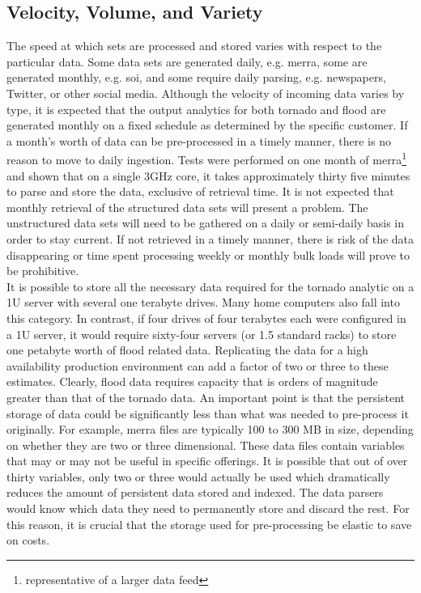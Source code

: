 \subsection{Velocity, Volume, and Variety}
The speed at which sets are processed and stored varies with respect to the particular data. Some data sets are generated daily, e.g. \gls{merra}, some are generated monthly, e.g. \gls{soi}, and some require daily parsing, e.g. newspapers, Twitter, or other social media. Although the velocity of incoming data varies by type, it is expected that the output analytics for both tornado and flood are generated monthly on a fixed schedule as determined by the specific customer. If a month's worth of data can be pre-processed in a timely manner, there is no reason to move to daily ingestion. Tests were performed on one month of  \gls{merra}\footnote{representative of a larger data feed} and shown that on a single 3GHz core, it takes approximately thirty five minutes to parse and store the data, exclusive of retrieval time. It is not expected that monthly retrieval of the structured data sets will present a problem. The unstructured data sets will need to be gathered on a daily or semi-daily basis in order to stay current. If not retrieved in a timely manner, there is risk of the data disappearing or time spent processing weekly or monthly bulk loads will prove to be prohibitive.\\

It is possible to store all the necessary data required for the tornado analytic on a 1U server with several one terabyte drives. Many home computers also fall into this category. In contrast, if four drives of four terabytes each were configured in a 1U server, it would require sixty-four servers  (or 1.5 standard racks) to store one petabyte worth of flood related data. Replicating the data for a high availability production environment can add a factor of two or three to these estimates. Clearly, flood data requires capacity that is orders of magnitude greater than that of the tornado data. An important point is that the persistent storage of data could be significantly less than what was needed to pre-process it originally. For example, \gls{merra} files are typically 100 to 300 MB in size, depending on whether they are two or three dimensional. These data files contain variables that may or may not be useful in specific offerings. It is possible that out of over thirty variables, only two or three would actually be used which dramatically reduces the amount of persistent data stored and indexed. The data parsers would know which data they need to permanently store and discard the rest. For this reason, it is crucial that the storage used for pre-processing be elastic to save on costs.\\

